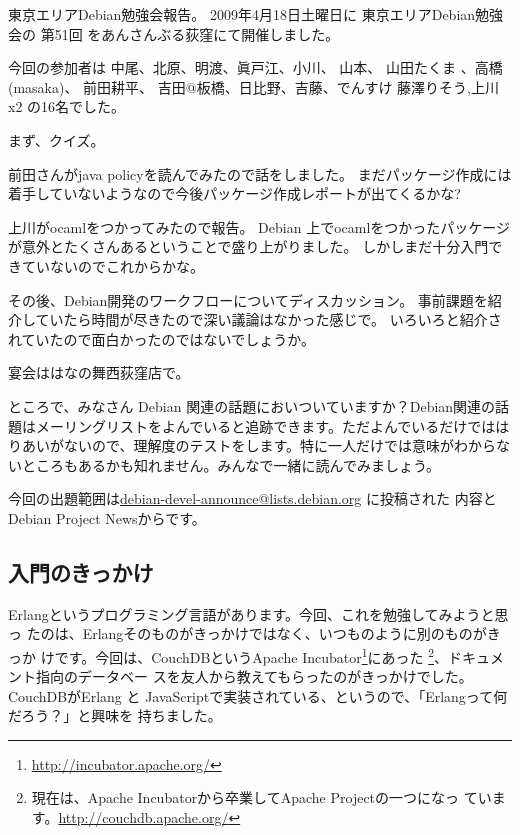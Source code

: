 \documentclass[mingoth,a4paper]{jsarticle}
\begin{document}
東京エリアDebian勉強会報告。
2009年4月18日土曜日に
東京エリアDebian勉強会の
第51回
をあんさんぶる荻窪にて開催しました。

今回の参加者は
中尾、北原、明渡、眞戸江、小川、
山本、 山田たくま 、高橋(masaka)、 前田耕平、 吉田@板橋、日比野、吉藤、でんすけ
藤澤りそう,上川x2
の16名でした。

まず、クイズ。

前田さんがjava policyを読んでみたので話をしました。
まだパッケージ作成には着手していないようなので今後パッケージ作成レポートが出てくるかな?

上川がocamlをつかってみたので報告。
Debian 上でocamlをつかったパッケージが意外とたくさんあるということで盛り上がりました。
しかしまだ十分入門できていないのでこれからかな。

その後、Debian開発のワークフローについてディスカッション。
事前課題を紹介していたら時間が尽きたので深い議論はなかった感じで。
いろいろと紹介されていたので面白かったのではないでしょうか。

宴会ははなの舞西荻窪店で。


ところで、みなさん Debian 関連の話題においついていますか？Debian関連の話
題はメーリングリストをよんでいると追跡できます。ただよんでいるだけではは
りあいがないので、理解度のテストをします。特に一人だけでは意味がわからな
いところもあるかも知れません。みんなで一緒に読んでみましょう。

今回の出題範囲は\url{debian-devel-announce@lists.debian.org} に投稿された
内容とDebian Project Newsからです。

\begin{multicols}{2}
 
\end{multicols}


\subsection{入門のきっかけ}
Erlangというプログラミング言語があります。今回、これを勉強してみようと思っ
たのは、Erlangそのものがきっかけではなく、いつものように別のものがきっか
けです。今回は、CouchDBというApache
Incubator\footnote{\url{http://incubator.apache.org/}}にあった
\footnote{現在は、Apache Incubatorから卒業してApache Projectの一つになっ
ています。\url{http://couchdb.apache.org/}}、ドキュメント指向のデータベー
スを友人から教えてもらったのがきっかけでした。CouchDBがErlang と
JavaScriptで実装されている、というので、「Erlangって何だろう？」と興味を
持ちました。
\end{document}
